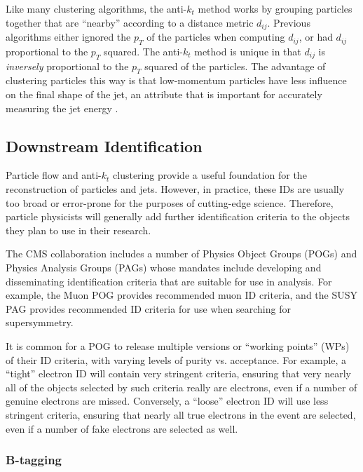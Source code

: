 Like many clustering algorithms, the anti-$k_t$ method works by
grouping particles together that are ``nearby'' according to a
distance metric $d_{ij}$. Previous algorithms either ignored the $p_T$
of the particles when computing $d_{ij}$, or had $d_{ij}$ proportional
to the $p_T$ squared. The anti-$k_t$ method is unique in that $d_{ij}$
is \emph{inversely} proportional to the $p_T$ squared of the
particles. The advantage of clustering particles this way is that
low-momentum particles have less influence on the final shape of the
jet, an attribute that is important for accurately measuring the jet
energy \cite{antikt}.


\subsection{Downstream Identification}
\label{ssec:cms:reco:downstream}

Particle flow and anti-$k_t$ clustering provide a useful foundation
for the reconstruction of particles and jets. However, in practice,
these IDs are usually too broad or error-prone for the
purposes of cutting-edge science. Therefore, particle physicists will
generally add further identification criteria to the objects they plan
to use in their research.

The CMS collaboration includes a number of Physics Object Groups
(POGs) and Physics Analysis Groups (PAGs) whose mandates include
developing and disseminating identification criteria that are suitable
for use in analysis. For example, the Muon POG provides recommended
muon ID criteria, and the SUSY PAG provides recommended
ID criteria for use when searching for supersymmetry.

It is common for a POG to release multiple versions or ``working
points'' (WPs) of their ID criteria, with varying levels of purity
vs. acceptance. For example, a ``tight'' electron ID will contain very
stringent criteria, ensuring that very nearly all of the objects selected
by such criteria really are electrons, even if a number of genuine
electrons are missed. Conversely, a ``loose'' electron ID will
use less stringent criteria, ensuring that nearly all true electrons
in the event are selected, even if a number of fake electrons are
selected as well.

\subsubsection{B-tagging}
\label{sssec:cms:reco:btagging}


